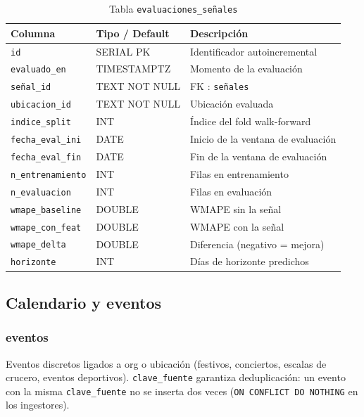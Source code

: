 \documentclass[12pt, a4paper]{article}
\begin{document}
\begin{table}[H]
\centering
\renewcommand{\arraystretch}{1.2}
\begin{tabular}{llp{5.5cm}}
\toprule
\textbf{Columna} & \textbf{Tipo / Default} & \textbf{Descripción} \\
\midrule
\texttt{id}               & SERIAL PK    & Identificador autoincremental \\
\texttt{evaluado\_en}     & TIMESTAMPTZ  & Momento de la evaluación \\
\texttt{señal\_id}        & TEXT NOT NULL & FK : \texttt{señales} \\
\texttt{ubicacion\_id}    & TEXT NOT NULL & Ubicación evaluada \\
\texttt{indice\_split}    & INT          & Índice del fold walk-forward \\
\texttt{fecha\_eval\_ini} & DATE         & Inicio de la ventana de evaluación \\
\texttt{fecha\_eval\_fin} & DATE         & Fin de la ventana de evaluación \\
\texttt{n\_entrenamiento} & INT          & Filas en entrenamiento \\
\texttt{n\_evaluacion}    & INT          & Filas en evaluación \\
\texttt{wmape\_baseline}  & DOUBLE       & WMAPE sin la señal \\
\texttt{wmape\_con\_feat} & DOUBLE       & WMAPE con la señal \\
\texttt{wmape\_delta}     & DOUBLE       & Diferencia (negativo = mejora) \\
\texttt{horizonte}        & INT          & Días de horizonte predichos \\
\bottomrule
\end{tabular}
\caption{Tabla \texttt{evaluaciones\_señales}}
\end{table}

\subsection{Calendario y eventos}

\subsubsection{eventos}

Eventos discretos ligados a org o ubicación (festivos, conciertos, escalas de crucero, eventos deportivos). \texttt{clave\_fuente} garantiza deduplicación: un evento con la misma \texttt{clave\_fuente} no se inserta dos veces (\texttt{ON CONFLICT DO NOTHING} en los ingestores).
\end{document}

